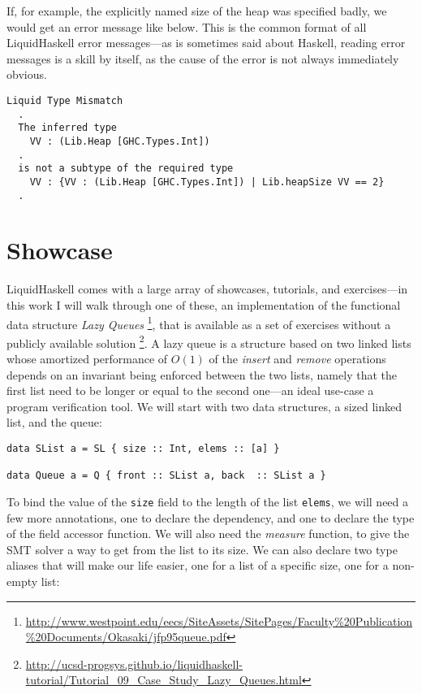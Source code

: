 \documentclass[11pt]{article}
\begin{document}
If, for example, the explicitly named size of the heap was specified badly, we
would get an error message like below. This is the common format of all
LiquidHaskell error messages---as is sometimes said about Haskell, reading error
messages is a skill by itself, as the cause of the error is not always
immediately obvious.

\begin{verbatim}
Liquid Type Mismatch
  .
  The inferred type
    VV : (Lib.Heap [GHC.Types.Int])
  .
  is not a subtype of the required type
    VV : {VV : (Lib.Heap [GHC.Types.Int]) | Lib.heapSize VV == 2}
  .
\end{verbatim}

\section{Showcase}
\label{sec:orgfd7ba5f}
LiquidHaskell comes with a large array of showcases, tutorials, and
exercises---in this work I will walk through one of these, an implementation of
the functional data structure \emph{Lazy Queues} \footnote{\url{http://www.westpoint.edu/eecs/SiteAssets/SitePages/Faculty\%20Publication\%20Documents/Okasaki/jfp95queue.pdf}}, that is available as a set of
exercises without a publicly available solution \footnote{\url{http://ucsd-progsys.github.io/liquidhaskell-tutorial/Tutorial\_09\_Case\_Study\_Lazy\_Queues.html}}. A lazy queue is a structure
based on two linked lists whose amortized performance of \(O(1)\) of the \emph{insert}
and \emph{remove} operations depends on an invariant being enforced between the two
lists, namely that the first list need to be longer or equal to the second
one---an ideal use-case a program verification tool. We will start with two data
structures, a sized linked list, and the queue:

\begin{verbatim}
data SList a = SL { size :: Int, elems :: [a] }

data Queue a = Q { front :: SList a, back  :: SList a }
\end{verbatim}

To bind the value of the \texttt{size} field to the length of the list \texttt{elems}, we will
need a few more annotations, one to declare the dependency, and one to declare
the type of the field accessor function. We will also need the \emph{measure} function,
to give the SMT solver a way to get from the list to its size. We can also
declare two type aliases that will make our life easier, one for a list of a
specific size, one for a non-empty list:
\end{document}
